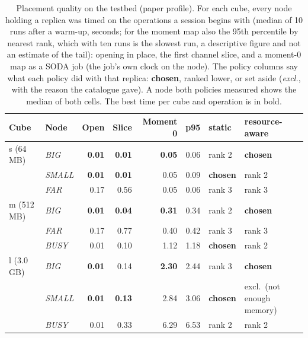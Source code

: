 \begin{table}
\centering
\caption{Placement quality on the testbed (paper profile). For each cube, every node holding a replica was timed on the operations a session begins with (median of 10 runs after a warm-up, seconds; for the moment map also the 95th percentile by nearest rank, which with ten runs is the slowest run, a descriptive figure and not an estimate of the tail): opening in place, the first channel slice, and a moment-0 map as a SODA job (the job's own clock on the node). The policy columns say what each policy did with that replica: \textbf{chosen}, ranked lower, or set aside (\emph{excl.}, with the reason the catalogue gave). A node both policies measured shows the median of both cells. The best time per cube and operation is in bold.}
\label{tab:placement}
\small
\begin{tabular*}{\linewidth}{@{\extracolsep{\fill}}llrrrrll}
\toprule
Cube & Node & Open & Slice & Moment 0 & p95 & static & resource-aware \\
\midrule
s (64\,MB) & \emph{BIG} & \textbf{0.01} & \textbf{0.01} & \textbf{0.05} & 0.06 & rank 2 & \textbf{chosen} \\
 & \emph{SMALL} & \textbf{0.01} & \textbf{0.01} & 0.05 & 0.09 & \textbf{chosen} & rank 2 \\
 & \emph{FAR} & 0.17 & 0.56 & 0.05 & 0.06 & rank 3 & rank 3 \\
\addlinespace
m (512\,MB) & \emph{BIG} & \textbf{0.01} & \textbf{0.04} & \textbf{0.31} & 0.34 & rank 2 & \textbf{chosen} \\
 & \emph{FAR} & 0.17 & 0.77 & 0.40 & 0.42 & rank 3 & rank 3 \\
 & \emph{BUSY} & 0.01 & 0.10 & 1.12 & 1.18 & \textbf{chosen} & rank 2 \\
\addlinespace
l (3.0\,GB) & \emph{BIG} & \textbf{0.01} & 0.14 & \textbf{2.30} & 2.44 & rank 3 & \textbf{chosen} \\
 & \emph{SMALL} & \textbf{0.01} & \textbf{0.13} & 2.84 & 3.06 & \textbf{chosen} & excl.\ (not enough memory) \\
 & \emph{BUSY} & 0.01 & 0.33 & 6.29 & 6.53 & rank 2 & rank 2 \\
\bottomrule
\end{tabular*}
\end{table}
